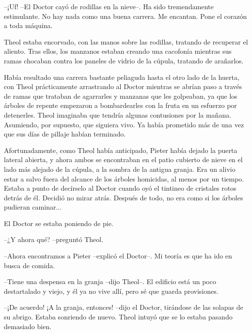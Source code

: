 --¡Uf! --El Doctor cayó de rodillas en la nieve--. Ha sido tremendamente estimulante. No hay nada como una buena carrera. Me encantan. Pone el corazón a toda máquina.



Theol estaba encorvado, con las manos sobre las rodillas, tratando de recuperar el aliento. Tras ellos, los manzanos estaban creando una cacofonía mientras sus ramas chocaban contra los paneles de vidrio de la cúpula, tratando de arañarlos.



Había resultado una carrera bastante peliaguda hasta el otro lado de la huerta, con Theol prácticamente arrastrando al Doctor mientras se abrían paso a través de ramas que trataban de agarrarles y manzanas que les golpeaban, ya que los árboles de repente empezaron a bombardearles con la fruta en un esfuerzo por detenerles. Theol imaginaba que tendría algunas contusiones por la mañana. Asumiendo, por supuesto, que siguiera vivo. Ya había prometido más de una vez que sus días de pillaje habían terminado.



Afortunadamente, como Theol había anticipado, Pieter había dejado la puerta lateral abierta, y ahora ambos se encontraban en el patio cubierto de nieve en el lado más alejado de la cúpula, a la sombra de la antigua granja. Era un alivio estar a salvo fuera del alcance de los árboles homicidas, al menos por un tiempo. Estaba a punto de decírselo al Doctor cuando oyó el tintineo de cristales rotos detrás de él. Decidió no mirar atrás. Después de todo, no era como si los árboles pudieran caminar...



El Doctor se estaba poniendo de pie.



--¿Y ahora qué? --preguntó Theol.



--Ahora encontramos a Pieter --explicó el Doctor--. Mi teoría es que ha ido en busca de comida.



--Tiene una despensa en la granja --dijo Theol--. El edificio está un poco destartalado y viejo, y él ya no vive allí, pero sé que guarda provisiones.



--¡De acuerdo! ¡A la granja, entonces! --dijo el Doctor, tirándose de las solapas de su abrigo. Estaba sonriendo de nuevo. Theol intuyó que se lo estaba pasando demasiado bien.



